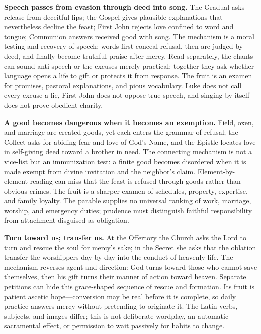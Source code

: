 \noindent\textbf{Speech passes from evasion through deed into song.\enspace{}}
The Gradual asks release from deceitful lips; the Gospel gives plausible explanations that nevertheless decline the feast; First John rejects love confined to word and tongue; Communion answers received good with song. The mechanism is a moral testing and recovery of speech: words first conceal refusal, then are judged by deed, and finally become truthful praise after mercy. Read separately, the chants can sound anti-speech or the excuses merely practical; together they ask whether language opens a life to gift or protects it from response. The fruit is an examen for promises, pastoral explanations, and pious vocabulary. Luke does not call every excuse a lie, First John does not oppose true speech, and singing by itself does not prove obedient charity.

\noindent\textbf{A good becomes dangerous when it becomes an exemption.\enspace{}}
Field, oxen, and marriage are created goods, yet each enters the grammar of refusal; the Collect asks for abiding fear and love of God's Name, and the Epistle locates love in self-giving deed toward a brother in need. The connecting mechanism is not a vice-list but an immunization test: a finite good becomes disordered when it is made exempt from divine invitation and the neighbor's claim. Element-by-element reading can miss that the feast is refused through goods rather than obvious crimes. The fruit is a sharper examen of schedules, property, expertise, and family loyalty. The parable supplies no universal ranking of work, marriage, worship, and emergency duties; prudence must distinguish faithful responsibility from attachment disguised as obligation.

\noindent\textbf{Turn toward us; transfer us.\enspace{}}
At the Offertory the Church asks the Lord to turn and rescue the soul for mercy's sake; in the Secret she asks that the oblation transfer the worshippers day by day into the conduct of heavenly life. The mechanism reverses agent and direction: God turns toward those who cannot save themselves, then his gift turns their manner of action toward heaven. Separate petitions can hide this grace-shaped sequence of rescue and formation. Its fruit is patient ascetic hope---conversion may be real before it is complete, so daily practice answers mercy without pretending to originate it. The Latin verbs, subjects, and images differ; this is not deliberate wordplay, an automatic sacramental effect, or permission to wait passively for habits to change.

